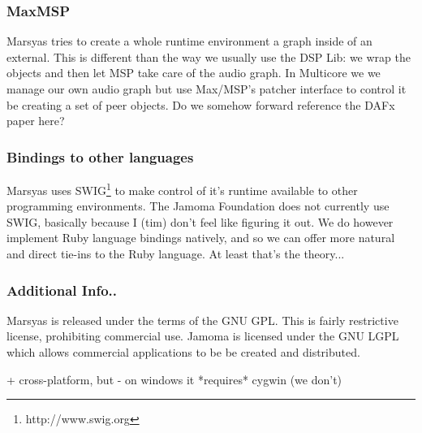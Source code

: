 \documentclass[twoside,10pt]{article}
\begin{document}
\subsubsection{MaxMSP}

Marsyas tries to create a whole runtime environment a graph inside of an external.  This is different than the way we usually use the DSP Lib: we wrap the objects and then let MSP take care of the audio graph.  In Multicore we we manage our own audio graph but use Max/MSP's patcher interface to control it be creating a set of peer objects.  Do we somehow forward reference the DAFx paper here?

\subsubsection{Bindings to other languages}

Marsyas uses SWIG\footnote{http://www.swig.org} to make control of it's runtime available to other programming environments.  The Jamoma Foundation does not currently use SWIG, basically because I (tim) don't feel like figuring it out.  We do however implement Ruby language bindings natively, and so we can offer more natural and direct tie-ins to the Ruby language.  At least that's the theory...



\subsubsection{Additional Info..}

Marsyas is released under the terms of the GNU GPL.  This is fairly restrictive license, prohibiting commercial use.  Jamoma is licensed under the GNU LGPL which allows commercial applications to be be created and distributed.

+ cross-platform, but 
- on windows it *requires* cygwin (we don't)

% 
\end{document}
